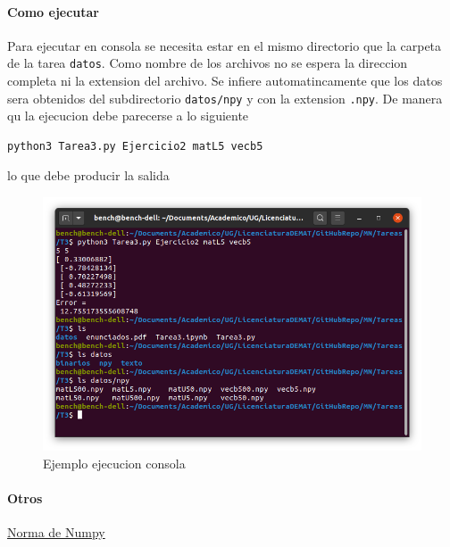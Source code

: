 \documentclass[11pt]{article}
\begin{document}
    \hypertarget{como-ejecutar}{%
\paragraph{Como ejecutar}\label{como-ejecutar}}

Para ejecutar en consola se necesita estar en el mismo directorio que la
carpeta de la tarea \texttt{datos}. Como nombre de los archivos no se
espera la direccion completa ni la extension del archivo. Se infiere
automatincamente que los datos sera obtenidos del subdirectorio
\texttt{datos/npy} y con la extension \texttt{.npy}. De manera qu la
ejecucion debe parecerse a lo siguiente

\begin{verbatim}
python3 Tarea3.py Ejercicio2 matL5 vecb5
\end{verbatim}

lo que debe producir la salida

\begin{figure}
\centering
\includegraphics{assets/T3-E2.png}
\caption{Ejemplo ejecucion consola}
\end{figure}

\hypertarget{otros}{%
\paragraph{Otros}\label{otros}}

\href{https://numpy.org/doc/stable/reference/generated/numpy.linalg.norm.html}{Norma
de Numpy}
\end{document}

